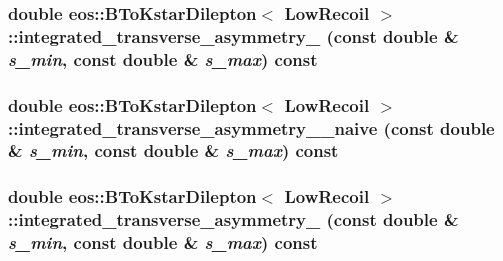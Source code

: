 \label{classeos_1_1BToKstarDilepton_3_01LowRecoil_01_4_a365d7cf15da41dfe34c5edb16df2c812}
\hypertarget{classeos_1_1BToKstarDilepton_3_01LowRecoil_01_4_a8986125c667918ce8d4a15e67c592c68}{
\subsubsection[{integrated\_\-transverse\_\-asymmetry\_\-4}]{\setlength{\rightskip}{0pt plus 5cm}double eos::BToKstarDilepton$<$ {\bf LowRecoil} $>$::integrated\_\-transverse\_\-asymmetry\_ (const double \& {\em s\_\-min}, \/  const double \& {\em s\_\-max}) const}}
\label{classeos_1_1BToKstarDilepton_3_01LowRecoil_01_4_a8986125c667918ce8d4a15e67c592c68}
\hypertarget{classeos_1_1BToKstarDilepton_3_01LowRecoil_01_4_ab2348dd3ac8e0d2d853b8c35d75a4a2b}{
\subsubsection[{integrated\_\-transverse\_\-asymmetry\_\-4\_\-naive}]{\setlength{\rightskip}{0pt plus 5cm}double eos::BToKstarDilepton$<$ {\bf LowRecoil} $>$::integrated\_\-transverse\_\-asymmetry\_\_\-naive (const double \& {\em s\_\-min}, \/  const double \& {\em s\_\-max}) const}}
\label{classeos_1_1BToKstarDilepton_3_01LowRecoil_01_4_ab2348dd3ac8e0d2d853b8c35d75a4a2b}
\hypertarget{classeos_1_1BToKstarDilepton_3_01LowRecoil_01_4_ae61a3da96c051d1b5da3bb7fcd1b42bc}{
\subsubsection[{integrated\_\-transverse\_\-asymmetry\_\-5}]{\setlength{\rightskip}{0pt plus 5cm}double eos::BToKstarDilepton$<$ {\bf LowRecoil} $>$::integrated\_\-transverse\_\-asymmetry\_ (const double \& {\em s\_\-min}, \/  const double \& {\em s\_\-max}) const}}

